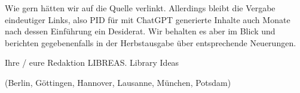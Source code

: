 \documentclass[a4paper,
fontsize=11pt,
oneside,
numbers=noperiodatend,
parskip=half-,
bibliography=totoc,
final
]{scrartcl}
\begin{document}
Wie gern hätten wir auf die Quelle verlinkt. Allerdings bleibt die
Vergabe eindeutiger Links, also PID für mit ChatGPT generierte Inhalte
auch Monate nach dessen Einführung ein Desiderat. Wir behalten es aber
im Blick und berichten gegebenenfalls in der Herbstausgabe über
entsprechende Neuerungen.

Ihre / eure Redaktion LIBREAS. Library Ideas

(Berlin, Göttingen, Hannover, Lausanne, München, Potsdam)

\end{document}
